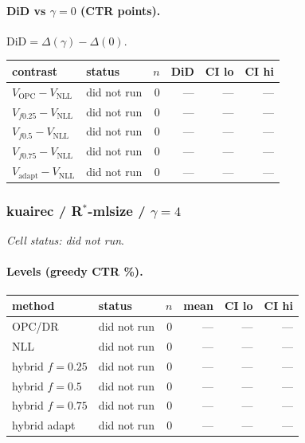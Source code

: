 \documentclass[10pt,a4paper]{article}
\begin{document}
\paragraph{DiD vs $\gamma=0$ (CTR points).} $\mathrm{DiD}=\Delta(\gamma)-\Delta(0)$.
{\centering\small\begin{tabular}{llrrrr}
\toprule contrast & status & $n$ & DiD & CI lo & CI hi \\
\midrule
$V_{\mathrm{OPC}}-V_{\mathrm{NLL}}$ & did not run & 0 & --- & --- & --- \\
$V_{f0.25}-V_{\mathrm{NLL}}$ & did not run & 0 & --- & --- & --- \\
$V_{f0.5}-V_{\mathrm{NLL}}$ & did not run & 0 & --- & --- & --- \\
$V_{f0.75}-V_{\mathrm{NLL}}$ & did not run & 0 & --- & --- & --- \\
$V_{\mathrm{adapt}}-V_{\mathrm{NLL}}$ & did not run & 0 & --- & --- & --- \\
\bottomrule\end{tabular}\par}
\bigskip
\subsubsection{kuairec / R$^*$-mlsize / $\gamma=4$}
\emph{Cell status: did not run}.
\paragraph{Levels (greedy CTR \%).}
{\centering\small\begin{tabular}{llrrrr}
\toprule method & status & $n$ & mean & CI lo & CI hi \\
\midrule
OPC/DR & did not run & 0 & --- & --- & --- \\
NLL & did not run & 0 & --- & --- & --- \\
hybrid $f{=}0.25$ & did not run & 0 & --- & --- & --- \\
hybrid $f{=}0.5$ & did not run & 0 & --- & --- & --- \\
hybrid $f{=}0.75$ & did not run & 0 & --- & --- & --- \\
hybrid adapt & did not run & 0 & --- & --- & --- \\
\bottomrule\end{tabular}\par}
\end{document}

